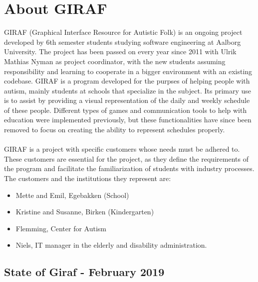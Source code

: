 \section{About GIRAF}
GIRAF (Graphical Interface Resource for Autistic Folk) is an ongoing project developed by 6th semester students studying software engineering at Aalborg University. 
The project has been passed on every year since 2011 with Ulrik Mathias Nyman as project coordinator, with the new students assuming responsibility and learning to cooperate in a bigger environment with an existing codebase. 
GIRAF is a program developed for the purpses of helping people with autism, mainly students at schools that specialize in the subject.
Its primary use is to assist by providing a visual representation of the daily and weekly schedule of these people.
Different types of games and communication tools to help with education were implemented previously, but these functionalities have since been removed to focus on creating the ability to represent schedules properly.
\\

\\
GIRAF is a project with specific customers whose needs must be adhered to. 
These customers are essential for the project, as they define the requirements of the program and facilitate the familiarization of students with industry processes.
The customers and the institutions they represent are: 
\begin{itemize}
    \item Mette and Emil, Egebakken (School)
    \item Kristine and Susanne, Birken (Kindergarten)
    \item Flemming, Center for Autism
    \item Niels, IT manager in the elderly and disability administration.
\end{itemize}

\subsection{State of Giraf - February 2019}
